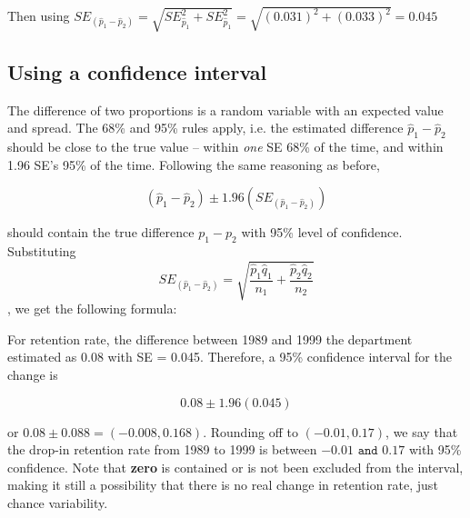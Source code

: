 \documentclass[11pt]{book}\usepackage[]{graphicx}\usepackage[]{color}
\begin{document}
\vspace{1cm}

Then using $ SE_{( \hat{p}_1 - \hat{p}_2)} = \sqrt{ SE_{\hat{p}_1}^2 + SE_{\hat{p}_1}^2} = \sqrt{ (0.031)^2 + (0.033)^2} = 0.045 $

\subsection{Using a confidence interval}

The difference of two proportions is a random variable with an expected value and spread.  The 68\% and 95\% rules apply, i.e.  the estimated difference $\hat{p}_1 - \hat{p}_2$ should be close to the true value -- within \textit{one} SE 68\% of the time, and within 1.96 SE's 95\% of the time.  Following the same reasoning as before,

\begin{equation*}
  (\hat{p}_1 - \hat{p}_2) \pm 1.96 (SE_{(\hat{p}_1 - \hat{p}_2)})
\end{equation*}

should contain the true difference $p_1 - p_2$ with 95\% level of confidence.  Substituting
$$ SE_{( \hat{p}_1 - \hat{p}_2)} = \sqrt{ \frac{ \hat{p}_1 \hat{q}_1}{n_1} + \frac{ \hat{p}_2 \hat{q}_2}{n_2}} $$,
we get the following formula:

\begin{center}
\end{center}

For retention rate, the difference between 1989 and 1999 the department estimated as 0.08 with SE = 0.045.  Therefore, a 95\% confidence interval for the change is

\begin{equation*}
0.08 \pm 1.96 (0.045)
\end{equation*}

or $0.08 \pm 0.088 = (-0.008, 0.168)$.  Rounding off to $(-0.01, 0.17)$, we say that the drop-in retention rate from 1989 to 1999 is between $-0.01 \texttt{ and } 0.17$ with 95\% confidence. Note that \textbf{zero} is contained or is not been excluded from the interval, making it still a possibility that there is no real change in retention rate, just chance variability.
\end{document}
